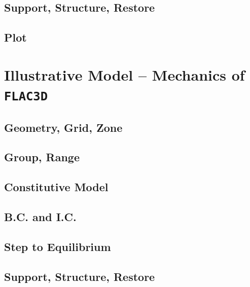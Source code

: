 \documentclass[a4paper, nobind]{templates/ociamthesis}
\begin{document}
\hypertarget{support-structure-restore}{%
\section{Support, Structure, Restore}\label{support-structure-restore}}

\hypertarget{plot}{%
\section{Plot}\label{plot}}

\hypertarget{illustrative-model-mechanics-of-flac3d}{%
\chapter{\texorpdfstring{Illustrative Model -- Mechanics of \texttt{FLAC3D}}{Illustrative Model -- Mechanics of FLAC3D}}\label{illustrative-model-mechanics-of-flac3d}}

\hypertarget{geometry-grid-zone-1}{%
\section{Geometry, Grid, Zone}\label{geometry-grid-zone-1}}

\hypertarget{group-range-1}{%
\section{Group, Range}\label{group-range-1}}

\hypertarget{constitutive-model-1}{%
\section{Constitutive Model}\label{constitutive-model-1}}

\hypertarget{b.c.-and-i.c.-1}{%
\section{B.C. and I.C.}\label{b.c.-and-i.c.-1}}

\hypertarget{step-to-equilibrium-1}{%
\section{Step to Equilibrium}\label{step-to-equilibrium-1}}

\hypertarget{support-structure-restore-1}{%
\section{Support, Structure, Restore}\label{support-structure-restore-1}}
\end{document}
